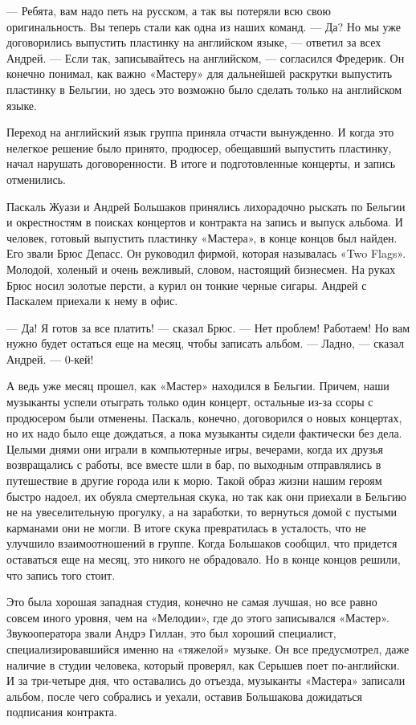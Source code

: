 \documentclass[16pt,a5paper]{book}
\begin{document}
— Ребята, вам надо петь на русском, а так вы потеряли всю свою оригинальность. Вы теперь стали как одна из наших команд.
— Да? Но мы уже договорились выпустить пластинку на английском языке, — ответил за всех Андрей.
— Если так, записывайтесь на английском, — согласился Фредерик. Он конечно понимал, как важно «Мастеру» для дальнейшей
раскрутки выпустить пластинку в Бельгии, но здесь это возможно было сделать только на английском языке.

Переход на английский язык группа приняла отчасти вынужденно. И когда это нелегкое решение было принято, продюсер,
обещавший выпустить пластинку, начал нарушать договоренности. В итоге и подготовленные концерты, и запись отменились.

Паскаль Жуази и Андрей Большаков принялись лихорадочно рыскать по Бельгии и окрестностям в поисках концертов и контракта
на запись и выпуск альбома. И человек, готовый выпустить пластинку «Мастера», в конце концов был найден. Его звали Брюс
Депасс. Он руководил фирмой, которая называлась «Two Flags». Молодой, холеный и очень вежливый, словом, настоящий
бизнесмен. На руках Брюс носил золотые персти, а курил он тонкие черные сигары. Андрей с Паскалем приехали к нему в
офис.

— Да! Я готов за все платить! — сказал Брюс. — Нет проблем! Работаем! Но вам нужно будет остаться еще на месяц, чтобы
записать альбом.
— Ладно, — сказал Андрей. — 0-кей!

А ведь уже месяц прошел, как «Мастер» находился в Бельгии. Причем, наши музыканты успели отыграть только один концерт,
остальные из-за ссоры с продюсером были отменены. Паскаль, конечно, договорился о новых концертах, но их надо было еще
дождаться, а пока музыканты сидели фактически без дела. Целыми днями они играли в компьютерные игры, вечерами, когда их
друзья возвращались с работы, все вместе шли в бар, по выходным отправлялись в путешествие в другие города или к морю.
Такой образ жизни нашим героям быстро надоел, их обуяла смертельная скука, но так как они приехали в Бельгию не на
увеселительную прогулку, а на заработки, то вернуться домой с пустыми карманами они не могли. В итоге скука превратилась
в усталость, что не улучшило взаимоотношений в группе. Когда Большаков сообщил, что придется оставаться еще на месяц,
это никого не обрадовало. Но в конце концов решили, что запись того стоит.

Это была хорошая западная студия, конечно не самая лучшая, но все равно совсем иного уровня, чем на «Мелодии», где до
этого записывался «Мастер». Звукооператора звали Андрэ Гиллан, это был хороший специалист, специализировавшийся именно
на «тяжелой» музыке. Он все предусмотрел, даже наличие в студии человека, который проверял, как Серышев поет
по-английски. И за три-четыре дня, что оставались до отъезда, музыканты «Мастера» записали альбом, после чего собрались
и уехали, оставив Большакова дожидаться подписания контракта.
\end{document}
